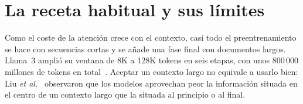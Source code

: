 \section{La receta habitual y sus límites}

Como el coste de la atención crece con el contexto, casi todo el preentrenamiento se hace con secuencias cortas y se añade una fase final con documentos largos. Llama~3 amplió su ventana de 8K a 128K tokens en seis etapas, con unos $800\,000$ millones de tokens en total~\cite[§3.4.2]{llama3}. Aceptar un contexto largo no equivale a usarlo bien: Liu \emph{et al.}~\cite{liu} observaron que los modelos aprovechan peor la información situada en el centro de un contexto largo que la situada al principio o al final.


